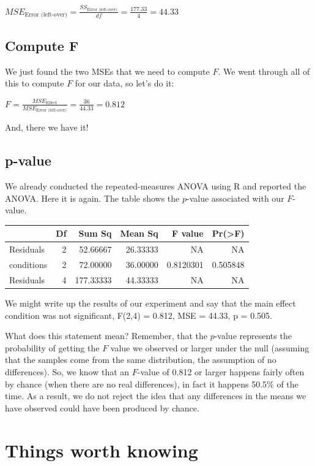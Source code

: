 \documentclass[
  letterpaper,
  DIV=11,
  numbers=noendperiod]{scrreprt}
\begin{document}
\(MSE_\text{Error (left-over)} = \frac{SS_\text{Error (left-over)}}{df} = \frac{177.33}{4}= 44.33\)

\subsection{Compute F}\label{compute-f}

We just found the two MSEs that we need to compute \(F\). We went
through all of this to compute \(F\) for our data, so let's do it:

\(F = \frac{MSE_\text{Effect}}{MSE_\text{Error (left-over)}} = \frac{36}{44.33}= 0.812\)

And, there we have it!

\subsection{p-value}\label{p-value}

We already conducted the repeated-measures ANOVA using R and reported
the ANOVA. Here it is again. The table shows the \(p\)-value associated
with our \(F\)-value.

\begin{longtable}[]{@{}lrrrrr@{}}
\toprule\noalign{}
& Df & Sum Sq & Mean Sq & F value & Pr(\textgreater F) \\
\midrule\noalign{}
\endhead
\bottomrule\noalign{}
\endlastfoot
Residuals & 2 & 52.66667 & 26.33333 & NA & NA \\
conditions & 2 & 72.00000 & 36.00000 & 0.8120301 & 0.505848 \\
Residuals & 4 & 177.33333 & 44.33333 & NA & NA \\
\end{longtable}

We might write up the results of our experiment and say that the main
effect condition was not significant, F(2,4) = 0.812, MSE = 44.33, p =
0.505.

What does this statement mean? Remember, that the \(p\)-value represents
the probability of getting the \(F\) value we observed or larger under
the null (assuming that the samples come from the same distribution, the
assumption of no differences). So, we know that an \(F\)-value of 0.812
or larger happens fairly often by chance (when there are no real
differences), in fact it happens 50.5\% of the time. As a result, we do
not reject the idea that any differences in the means we have observed
could have been produced by chance.

\section{Things worth knowing}\label{things-worth-knowing}
\end{document}
